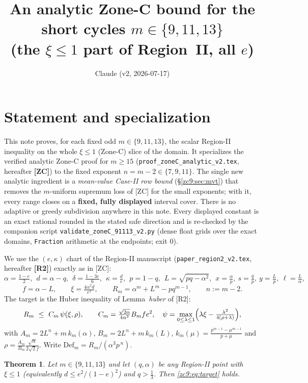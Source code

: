 \documentclass[11pt]{amsart}
\title[Analytic Zone C for $m\in\{9,11,13\}$]{An analytic Zone-C bound for the
short cycles $m\in\{9,11,13\}$\\ (the $\xi\le1$ part of Region~II, all $e$)}
\author{Claude (v2, 2026-07-17)}
\newtheorem{theorem}{Theorem}[section]
\newcommand{\Def}{\mathrm{Def}}
\begin{document}
\maketitle

\section{Statement and specialization}\label{zc9:sec:setup}

This note proves, for each fixed odd $m\in\{9,11,13\}$, the scalar Region-II
inequality on the whole $\xi\le1$ (Zone-C) slice of the domain.  It specializes
the verified analytic Zone-C proof for $m\ge15$
(\texttt{proof\_zoneC\_analytic\_v2.tex}, hereafter \textbf{[ZC]}) to the fixed
exponent $n=m-2\in\{7,9,11\}$.  The single new analytic ingredient is a
\emph{mean-value Case-II row bound} (\S\ref{zc9:sec:mvt}) that removes the
$m$-uniform supremum loss of [ZC] for the small exponents; with it, every range
closes on a \textbf{fixed, fully displayed} interval cover.  There is no
adaptive or greedy subdivision anywhere in this note.  Every displayed constant
is an exact rational rounded in the stated safe direction and is re-checked by
the companion script \texttt{validate\_zoneC\_91113\_v2.py} (dense float grids
over the exact domains, \texttt{Fraction} arithmetic at the endpoints; exit
$0$).

We use the $(e,\kappa)$ chart of the Region-II manuscript
(\texttt{paper\_region2\_v2.tex}, hereafter \textbf{[R2]}) exactly as in [ZC]:
\[
 \alpha=\tfrac{1-e}2,\ \ d=\alpha-q,\ \ \delta=\tfrac{1-3e}6,\ \
 \kappa=\tfrac de,\ \ p=1-q,\ \ L=\sqrt{pq-\alpha^2},\ \
 x=\tfrac\alpha p,\ s=\tfrac qp,\ y=\tfrac Lp,\ \ell=\tfrac L\alpha,
\]
\[
 f=\alpha-L,\qquad \xi=\tfrac{4\alpha^2d}{e^2},\qquad
 R_m=\alpha^m+L^m-pq^{m-1},\qquad n:=m-2 .
\]
The target is the Huber inequality of Lemma~\emph{huber} of [R2]:
\begin{equation}\label{zc9:eq:target}
 R_m\ \le\ C_m\,\psi(\xi,\rho),\qquad
 C_m=\tfrac{\sqrt{2\alpha}}{4\alpha^2}B_mf e^2,\quad
 \psi=\max_{0\le\lambda\le1}\Bigl(\lambda\xi-\tfrac{\lambda^2}{4(\rho+\lambda)}\Bigr),
\end{equation}
with $A_m=2L^{n}+m\,k_m(\alpha)$, $B_m=2L^{n}+m\,k_m(L)$,
$k_m(\mu)=\tfrac{p^{m-1}-\mu^{m-1}}{p+\mu}$ and
$\rho=\tfrac{A_m}{B_m}\tfrac{\sqrt\alpha}{2\sqrt2 f}$.  Write
$\Def_m=R_m/(\alpha^3p^{\,n})$.

\begin{theorem}\label{zc9:thm:main}
Let $m\in\{9,11,13\}$ and let $(q,\alpha)$ be any Region-II point with $\xi\le1$
(equivalently $d\le e^2/(1-e)^2$) and $q>\tfrac13$.  Then
\eqref{zc9:eq:target} holds.
\end{theorem}
\end{document}
